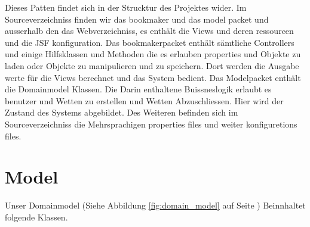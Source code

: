 \documentclass[a4paper, abstracton]{scrartcl}
\begin{document}
  Dieses Patten findet sich in der Strucktur des Projektes wider.
  Im Sourceverzeichniss finden wir das bookmaker und das model packet und
  ausserhalb den das Webverzeichniss, es enthält die Views und deren ressourcen
  und die JSF konfiguration.
  Das bookmakerpacket enthält sämtliche Controllers und einige Hilfsklassen und
  Methoden die es erlauben properties und Objekte zu laden oder Objekte zu
  manipulieren und zu speichern.
  Dort werden die Ausgabe werte für die Views berechnet und das System bedient.
  Das Modelpacket enthält die Domainmodel Klassen. Die Darin enthaltene
  Buissneslogik erlaubt es benutzer und Wetten zu erstellen und Wetten
  Abzuschliessen. Hier wird der Zustand des Systems abgebildet.
  Des Weiteren befinden sich im Sourceverzeichniss die Mehrsprachigen properties
  files und weiter konfiguretions files.
  
\pagebreak

\section{Model}
 
  Unser Domainmodel
  (Siehe Abbildung \ref{fig:domain_model} auf Seite \pageref{fig:domain_model})
  Beinnhaltet folgende Klassen.
  
\end{document}
